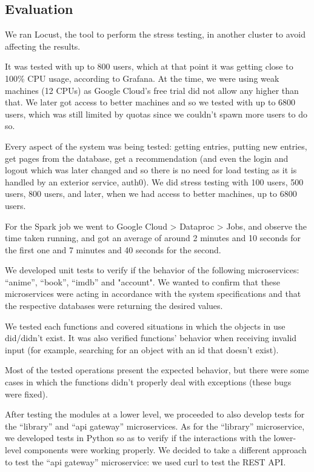 \documentclass[oneside]{article}
\newcommand*\fpar{\hspace{1ex}}
\begin{document}
  \subsection{Evaluation}
  \label{sec:evaluation}
  \fpar We ran Locust, the tool to perform the stress testing, in another cluster to avoid affecting the results. 
  \par It was tested with up to 800 users, which at that point it was getting close to 100\% CPU usage, according to Grafana. At the time, we were using weak machines (12 CPUs) as Google Cloud's free trial did not allow any higher than that. We later got access to better machines and so we tested with up to 6800 users, which was still limited by quotas since we couldn't spawn more users to do so.
  \par Every aspect of the system was being tested: getting entries, putting new entries, get pages from the database, get a recommendation (and even the login and logout which was later changed and so there is no need for load testing as it is handled by an exterior service, auth0). We did stress testing with 100 users, 500 users, 800 users, and later, when we had access to better machines, up to 6800 users.
  \par For the Spark job we went to Google Cloud > Dataproc > Jobs, and observe the time taken running, and got an average of around 2 minutes and 10 seconds for the first one and 7 minutes and 40 seconds for the second.
  \par We developed unit tests to verify if the behavior of the following microservices: “anime”, “book”, “imdb” and "account". We wanted to confirm that these microservices were acting in accordance with the system specifications and that the respective databases were returning the desired values.
  \par We tested each functions and covered situations in which the objects in use did/didn't exist. It was also verified functions' behavior when receiving invalid input (for example, searching for an object with an id that doesn't  exist).
  \par Most of the tested operations present the expected behavior, but there were some cases in which the functions didn't properly deal with exceptions (these bugs were fixed).
  \par After testing the modules at a lower level, we proceeded to also develop tests for the “library” and “api gateway” microservices. As for the “library” microservice, we developed tests in Python so as to verify if the interactions with the lower-level components were working properly. We decided to take a different approach to test the “api gateway” microservice: we used curl to test the REST API.
  
\end{document}
